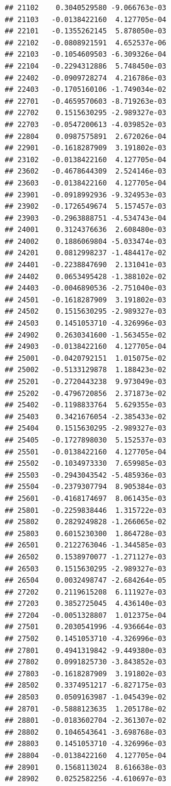 \documentclass[ignorenonframetext,]{beamer}
\begin{document}
\begin{frame}[fragile]
\begin{verbatim}
## 21102    0.3040529580 -9.066763e-03
## 21103   -0.0138422160  4.127705e-04
## 22101   -0.1355262145  5.878050e-03
## 22102   -0.0808921591  4.652537e-06
## 22103   -0.1054609503 -6.309326e-04
## 22104   -0.2294312886  5.748450e-03
## 22402   -0.0909728274  4.216786e-03
## 22403   -0.1705160106 -1.749034e-02
## 22701   -0.4659570603 -8.719263e-03
## 22702    0.1515630295 -2.989327e-03
## 22703   -0.0547200613 -4.039852e-03
## 22804    0.0987575891  2.672026e-04
## 22901   -0.1618287909  3.191802e-03
## 23102   -0.0138422160  4.127705e-04
## 23602   -0.4678644309  2.524146e-03
## 23603   -0.0138422160  4.127705e-04
## 23901   -0.0918992936 -9.324953e-03
## 23902   -0.1726549674  5.157457e-03
## 23903   -0.2963888751 -4.534743e-04
## 24001    0.3124376636  2.608480e-03
## 24002    0.1886069804 -5.033474e-03
## 24201    0.0812998237 -1.484417e-02
## 24401   -0.2238847690  2.131041e-03
## 24402    0.0653495428 -1.388102e-02
## 24403   -0.0046890536 -2.751040e-03
## 24501   -0.1618287909  3.191802e-03
## 24502    0.1515630295 -2.989327e-03
## 24503    0.1451053710 -4.326996e-03
## 24902    0.2630341600 -1.563455e-02
## 24903   -0.0138422160  4.127705e-04
## 25001   -0.0420792151  1.015075e-02
## 25002   -0.5133129878  1.188423e-02
## 25201   -0.2720443238  9.973049e-03
## 25202   -0.4796720856  2.371873e-02
## 25402   -0.1198833764  5.629355e-03
## 25403    0.3421676054 -2.385433e-02
## 25404    0.1515630295 -2.989327e-03
## 25405   -0.1727898030  5.152537e-03
## 25501   -0.0138422160  4.127705e-04
## 25502   -0.1034973330  7.659985e-03
## 25503   -0.2943043542 -5.485936e-03
## 25504   -0.2379307794  8.905384e-03
## 25601   -0.4168174697  8.061435e-03
## 25801   -0.2259838446  1.315722e-03
## 25802    0.2829249828 -1.266065e-02
## 25803    0.6015230300  1.864728e-03
## 26501    0.2122763046 -1.344585e-03
## 26502    0.1538970077 -1.271127e-03
## 26503    0.1515630295 -2.989327e-03
## 26504    0.0032498747 -2.684264e-05
## 27202    0.2119615208  6.111927e-03
## 27203    0.3852725045  4.436140e-03
## 27204   -0.0051328807  1.012375e-04
## 27501    0.2030541996 -4.936664e-03
## 27502    0.1451053710 -4.326996e-03
## 27801    0.4941319842 -9.449380e-03
## 27802    0.0991825730 -3.843852e-03
## 27803   -0.1618287909  3.191802e-03
## 28502    0.3374951217 -6.827175e-03
## 28503    0.0509163987 -1.045439e-02
## 28701   -0.5888123635  1.205178e-02
## 28801   -0.0183602704 -2.361307e-02
## 28802    0.1046543641 -3.698768e-03
## 28803    0.1451053710 -4.326996e-03
## 28804   -0.0138422160  4.127705e-04
## 28901    0.1568113024  8.616638e-03
## 28902    0.0252582256 -4.610697e-03

\end{verbatim}
\end{frame}
\end{document}
